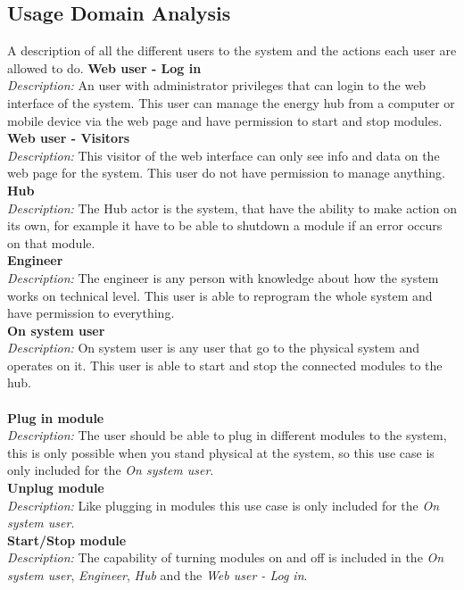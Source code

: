 \subsection{Usage Domain Analysis}
A description of all the different users to the system and the actions each user are allowed to do.
	\textbf{Web user - Log in}
	\\\textit{Description: }
	An user with administrator privileges that can login to the web interface of the system. This user can manage the energy hub from a computer or mobile device via the web page and have permission to start and stop modules.
	\\\textbf{Web user - Visitors}
	\\\textit{Description: }
	This visitor of the web interface can only see info and data on the web page for the system. This user do not have permission to manage anything.
	\\\textbf{Hub}
	\\\textit{Description: }
	The Hub actor is the system, that have the ability to make action on its own, for example it have to be able to shutdown a module if an error occurs on that module.
	\\\textbf{Engineer}
	\\\textit{Description: }
	The engineer is any person with knowledge about how the system works on technical level. This user is able to reprogram the whole system and have permission to everything.
	\\\textbf{On system user}
	\\\textit{Description: }
	On system user is any user that go to the physical system and operates on it. This user is able to start and stop the connected modules to the hub.
	\\\\\textbf{Plug in module}
	\\\textit{Description: }
	The user should be able to plug in different modules to the system, this is only possible when you stand physical at the system, so this use case is only included for the	\textit{On system user}.
	\\\textbf{Unplug module}
	\\\textit{Description: }
	Like plugging in modules this use case is only included for the \textit{On system user}.
	\\\textbf{Start/Stop module}
	\\\textit{Description: }
	The capability of turning modules on and off is included in the \textit{On system user}, \textit{Engineer}, \textit{Hub} and the \textit{Web user - Log in}.
